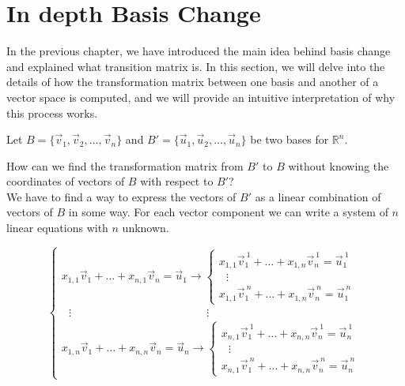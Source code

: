 \section{In depth Basis Change}
\label{subsection:indepth-basis-change}
In the previous chapter, we have introduced the main idea behind basis change and explained what transition matrix is. In this section, we will delve into the details of how the transformation matrix between one basis and another of a vector space is computed, and we will provide an intuitive interpretation of why this process works. 

Let $B = \{\vec{v}_1, \vec{v}_2, \ldots, \vec{v}_n\}$ and $B' = \{\vec{u}_1, \vec{u}_2, \ldots, \vec{u}_n\}$ be two bases for $\mathbb{R}^n$. 

How can we find the transformation matrix from $B'$ to $B$ without knowing the coordinates of vectors of $B$ with respect to $B'$?\\

We have to find a way to express the vectors of $B'$ as a linear combination of vectors of $B$ in some way.
For each vector component we can write a system of $n$ linear equations with $n$ unknown.


$$
\begin{cases}
    x_{1,1} \vec v_1 + \ldots + x_{n,1} \vec v_n = \vec u_1  \longrightarrow \begin{cases}
                                                                                x_{1,1} \vec v_1^{\ 1} + \ldots + x_{1,n} \vec v_n^{\ 1} = \vec u_1^{\ 1} \\
                                                                                \ \ \ \vdots\\
                                                                                x_{1,1} \vec v_1^{\ n} + \ldots + x_{1,n} \vec v_n^{\ n} = \vec u_1^{\ n}  
                                                                             \end{cases}\\
    \ \ \ \vdots \quad \quad \quad \quad \quad \quad \quad \quad \quad \quad \quad \quad \ \vdots\\
    x_{1,n} \vec v_1 + \ldots + x_{n,n} \vec v_n = \vec u_n  \longrightarrow \begin{cases}
                                                                                x_{n,1} \vec v_1^{\ 1} + \ldots + x_{n,n} \vec v_n^{\ 1} = \vec u_n^{\ 1} \\
                                                                                \ \ \ \vdots\\
                                                                                x_{n,1} \vec v_1^{\ n} + \ldots + x_{n,n} \vec v_n^{\ n} = \vec u_n^{\ n}  
                                                                             \end{cases}
\end{cases}
$$

